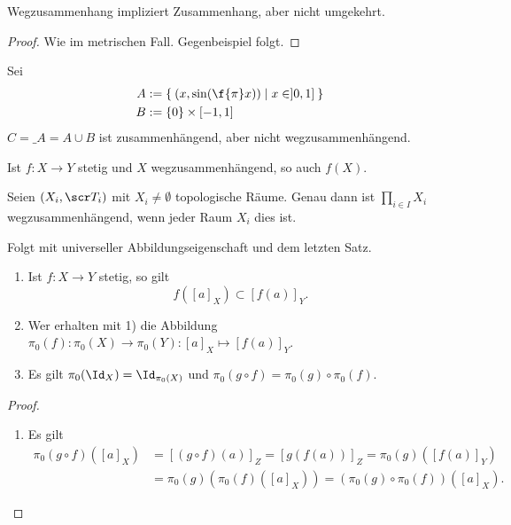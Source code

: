 \begin{st}
	Wegzusammenhang impliziert Zusammenhang, aber nicht umgekehrt.
	\begin{proof}
		Wie im metrischen Fall.
		Gegenbeispiel folgt. %
	\end{proof}
\end{st}

\begin{ex}
	Sei
	\begin{align*}
		A &:= \Set{ (x, \sin( \f {\pi}x)) | x \in ]0,1] } \\
		B &:= \{0\} \times [-1, 1]
	\end{align*}
	$C = \_A = A \cup B$ ist zusammenhängend, aber nicht wegzusammenhängend.
\end{ex}


\begin{st}
	Ist $f: X \to Y$ stetig und $X$ wegzusammenhängend, so auch $f(X)$.
\end{st}

\begin{st}
	Seien $(X_i, \scr T_i)$ mit $X_i \neq \emptyset$ topologische Räume.
	Genau dann ist $\prod_{i \in I} X_i$ wegzusammenhängend, wenn jeder Raum $X_i$ dies ist.
	\begin{st}
		Folgt mit universeller Abbildungseigenschaft und dem letzten Satz.
	\end{st}
\end{st}

\begin{st}
	\begin{enumerate}[1)]
		\item
			Ist $f: X \to Y$ stetig, so gilt
			\[
				f([a]_X) \subset [f(a)]_Y.
			\]
		\item
			Wer erhalten mit 1) die Abbildung $\pi_0(f): \pi_0(X) \to \pi_0(Y): [a]_X \mapsto [f(a)]_Y$.
		\item
			Es gilt $\pi_0(\Id_X) = \Id_{\pi_0(X)}$ und $\pi_0(g \circ f) = \pi_0(g) \circ \pi_0(f)$.
	\end{enumerate}
	\begin{proof}
		\begin{enumerate}[1),start=3]
			\item
				Es gilt
				\begin{align*}
					\pi_0(g\circ f)([a]_X)
					&= [(g\circ f)(a)]_Z
					= [g(f(a))]_Z
					= \pi_0(g)([f(a)]_Y) \\
					&= \pi_0(g)(\pi_0(f)([a]_X))
					= (\pi_0(g)\circ \pi_0(f))([a]_X).
				\end{align*}
		\end{enumerate}
	\end{proof}
\end{st}


